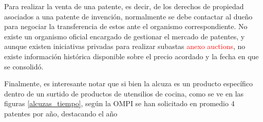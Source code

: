 Para realizar la venta de una patente, es decir, de los derechos de propiedad asociados a una patente de invención, normalmente se debe contactar al dueño para negociar la transferencia de estos ante el organismo correspondiente. No existe un organismo oficial encargado de gestionar el mercado de patentes, y aunque existen iniciativas privadas para realizar subastas \textcolor{red}{anexo auctions}, no existe información histórica disponible sobre el precio acordado y la fecha en que se consolidó.


Finalmente, es interesante notar que si bien la alcuza es un producto específico dentro de un surtido de productos de utensilios de cocina, como se ve en las figuras \ref{alcuzas_tiempo}, según la OMPI se han solicitado en promedio 4 patentes por año, destacando el año
